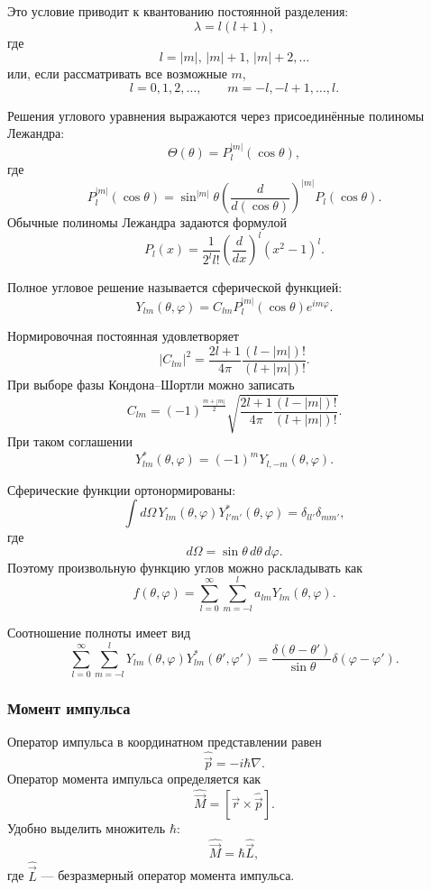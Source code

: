 \documentclass[12pt,a4paper]{article}
\begin{document}
Это условие приводит к квантованию постоянной разделения:
\[
    \boxed{
        \lambda=l(l+1)
    },
\]
где
\[
    l=|m|,\,|m|+1,\,|m|+2,\ldots
\]
или, если рассматривать все возможные $m$,
\[
    l=0,1,2,\ldots,
    \qquad
    m=-l,-l+1,\ldots,l.
\]

Решения углового уравнения выражаются через присоединённые полиномы
Лежандра:
\[
    \Theta(\theta)
    =
    P_l^{|m|}(\cos\theta),
\]
где
\[
    P_l^{|m|}(\cos\theta)
    =
    \sin^{|m|}\theta
    \left(
        \frac{d}{d(\cos\theta)}
    \right)^{|m|}
    P_l(\cos\theta).
\]
Обычные полиномы Лежандра задаются формулой
\[
    \boxed{
    P_l(x)
    =
    \frac{1}{2^l l!}
    \left(
        \frac{d}{dx}
    \right)^l
    (x^2-1)^l
    }.
\]

Полное угловое решение называется сферической функцией:
\[
    \boxed{
        Y_{lm}(\theta,\varphi)
        =
        C_{lm}
        P_l^{|m|}(\cos\theta)e^{im\varphi}
    }.
\]

Нормировочная постоянная удовлетворяет
\[
    \boxed{
    |C_{lm}|^2
    =
    \frac{2l+1}{4\pi}
    \frac{(l-|m|)!}{(l+|m|)!}
    }.
\]
При выборе фазы Кондона--Шортли можно записать
\[
    C_{lm}
    =
    (-1)^{\frac{m+|m|}{2}}
    \sqrt{
        \frac{2l+1}{4\pi}
        \frac{(l-|m|)!}{(l+|m|)!}
    }.
\]
При таком соглашении
\[
    \boxed{
        Y_{lm}^*(\theta,\varphi)
        =
        (-1)^mY_{l,-m}(\theta,\varphi)
    }.
\]

Сферические функции ортонормированы:
\[
    \boxed{
    \int d\Omega\,
    Y_{lm}(\theta,\varphi)
    Y_{l'm'}^*(\theta,\varphi)
    =
    \delta_{ll'}\delta_{mm'}
    },
\]
где
\[
    d\Omega=\sin\theta\,d\theta\,d\varphi.
\]
Поэтому произвольную функцию углов можно раскладывать как
\[
    f(\theta,\varphi)
    =
    \sum_{l=0}^{\infty}
    \sum_{m=-l}^{l}
    a_{lm}Y_{lm}(\theta,\varphi).
\]

Соотношение полноты имеет вид
\[
    \boxed{
    \sum_{l=0}^{\infty}
    \sum_{m=-l}^{l}
    Y_{lm}(\theta,\varphi)
    Y_{lm}^*(\theta',\varphi')
    =
    \frac{\delta(\theta-\theta')}{\sin\theta}
    \delta(\varphi-\varphi')
    }.
\]

\subsubsection{Момент импульса}

Оператор импульса в координатном представлении равен
\[
    \hat{\vec p}=-i\hbar\nabla.
\]
Оператор момента импульса определяется как
\[
    \boxed{
        \hat{\vec M}
        =
        [\vec r\times\hat{\vec p}]
    }.
\]
Удобно выделить множитель $\hbar$:
\[
    \hat{\vec M}=\hbar\hat{\vec L},
\]
где $\hat{\vec L}$ --- безразмерный оператор момента импульса.
\end{document}
